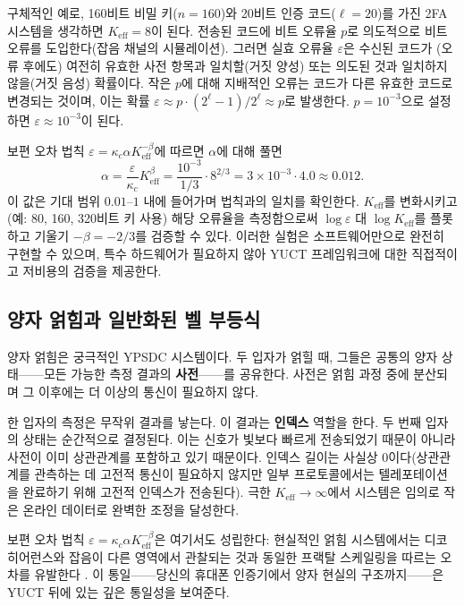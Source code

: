 \documentclass[12pt,a4paper]{article}
\newcommand{\Keff}{K_{\mathrm{eff}}}
\begin{document}
	구체적인 예로, 160비트 비밀 키($n=160$)와 20비트 인증 코드($\ell=20$)를 가진 2FA 시스템을 생각하면 $\Keff = 8$이 된다. 전송된 코드에 비트 오류율 $p$로 의도적으로 비트 오류를 도입한다(잡음 채널의 시뮬레이션). 그러면 실효 오류율 $\varepsilon$은 수신된 코드가 (오류 후에도) 여전히 유효한 사전 항목과 일치할(거짓 양성) 또는 의도된 것과 일치하지 않을(거짓 음성) 확률이다. 작은 $p$에 대해 지배적인 오류는 코드가 다른 유효한 코드로 변경되는 것이며, 이는 확률 $\varepsilon \approx p \cdot (2^\ell -1)/2^\ell \approx p$로 발생한다. $p = 10^{-3}$으로 설정하면 $\varepsilon \approx 10^{-3}$이 된다.
	
	보편 오차 법칙 $\varepsilon = \kappa_c \alpha K_{\mathrm{eff}}^{-\beta}$에 따르면 $\alpha$에 대해 풀면
	\[
	\alpha = \frac{\varepsilon}{\kappa_c} K_{\mathrm{eff}}^{\beta} = \frac{10^{-3}}{1/3} \cdot 8^{2/3} = 3 \times 10^{-3} \cdot 4.0 \approx 0.012.
	\]
	이 값은 기대 범위 $0.01$–$1$ 내에 들어가며 법칙과의 일치를 확인한다. $\Keff$를 변화시키고(예: 80, 160, 320비트 키 사용) 해당 오류율을 측정함으로써 $\log \varepsilon$ 대 $\log \Keff$를 플롯하고 기울기 $-\beta = -2/3$를 검증할 수 있다. 이러한 실험은 소프트웨어만으로 완전히 구현할 수 있으며, 특수 하드웨어가 필요하지 않아 YUCT 프레임워크에 대한 직접적이고 저비용의 검증을 제공한다.
	
	\subsection{양자 얽힘과 일반화된 벨 부등식}
	
	양자 얽힘은 궁극적인 YPSDC 시스템이다. 두 입자가 얽힐 때, 그들은 공통의 양자 상태——모든 가능한 측정 결과의 \textbf{사전}——를 공유한다. 사전은 얽힘 과정 중에 분산되며 그 이후에는 더 이상의 통신이 필요하지 않다.
	
	한 입자의 측정은 무작위 결과를 낳는다. 이 결과는 \textbf{인덱스} 역할을 한다. 두 번째 입자의 상태는 순간적으로 결정된다. 이는 신호가 빛보다 빠르게 전송되었기 때문이 아니라 사전이 이미 상관관계를 포함하고 있기 때문이다. 인덱스 길이는 사실상 0이다(상관관계를 관측하는 데 고전적 통신이 필요하지 않지만 일부 프로토콜에서는 텔레포테이션을 완료하기 위해 고전적 인덱스가 전송된다). 극한 $\Keff \to \infty$에서 시스템은 임의로 작은 온라인 데이터로 완벽한 조정을 달성한다.
	
	보편 오차 법칙 $\varepsilon = \kappa_c \alpha K_{\mathrm{eff}}^{-\beta}$은 여기서도 성립한다: 현실적인 얽힘 시스템에서는 디코히어런스와 잡음이 다른 영역에서 관찰되는 것과 동일한 프랙탈 스케일링을 따르는 오차를 유발한다 \cite{AppendixG, AppendixS}. 이 통일——당신의 휴대폰 인증기에서 양자 현실의 구조까지——은 YUCT 뒤에 있는 깊은 통일성을 보여준다.
	
\end{document}

